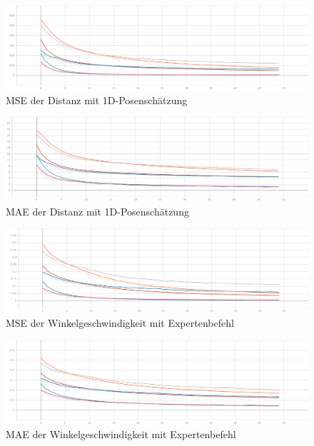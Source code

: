 \begin{figure}[H]
	\centering
	\includegraphics[width=\linewidth]{kapitel5/images/d-only/Loss-d-only.png}
	\caption{MSE der Distanz mit 1D-Posenschätzung}
	\label{1d-poses-mse-d}
\end{figure}

\begin{figure}[H]
	\centering
	\includegraphics[width=\linewidth]{kapitel5/images/d-only/Mean_Abs_Error_d-d-only.png}
	\caption{MAE der Distanz mit 1D-Posenschätzung}
	\label{1d-poses-mae-d}
\end{figure}



\begin{figure}[H]
	\centering
	\includegraphics[width=\linewidth]{kapitel5/images/expert/Loss-expert.png}
	\caption{MSE der Winkelgeschwindigkeit mit Expertenbefehl}
	\label{expert-mse-omega}
\end{figure}

\begin{figure}[H]
	\centering
	\includegraphics[width=\linewidth]{kapitel5/images/expert/Mean_Abs_Error_omega-expert.png}
	\caption{MAE der Winkelgeschwindigkeit mit Expertenbefehl}
	\label{expert-mae-omega}
\end{figure}

